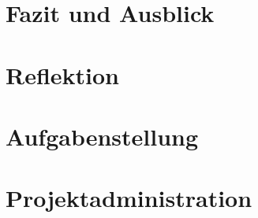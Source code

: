 \documentclass[
11pt, %
a4paper, %
BCOR25mm, %
DIV14, %
footsepline = false, %
headsepline, %
twoside, %
openright,
abstracton, %
listof=totocnumbered, %
bibliography=totocnumbered %
]{scrreprt}
\begin{document}
  \chapter{Fazit und Ausblick}\label{chapter:FazitUndAusblick}

  \cleardoublepage
  
  
  \chapter{Reflektion}\label{chapter:Reflektion}
  
   
  
  \cleardoublepage
  
  
  \appendix
  
  
  
  \chapter{Aufgabenstellung}\label{chapter:Aufgabenstellung}
  
  

  \cleardoublepage
   
    
  \chapter{Projektadministration}\label{chapter:Projektadministration}
 
\end{document}
